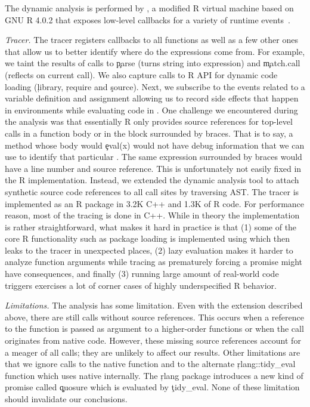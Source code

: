 \documentclass[screen,acmsmall]{acmart}
\newcommand{\mypara}[1]{\medskip\noindent\emph{#1}\xspace}
\begin{document}
The dynamic analysis is performed by \rdyntrace, a modified R virtual machine
based on GNU R 4.0.2 that exposes low-level callbacks for a variety of runtime
events~\cite{oopsla19b}.

\mypara{Tracer.} The tracer registers callbacks to all \eval functions as well
as a few other ones that allow us to better identify where do the expressions
come from. For example, we taint the results of calls to \c{parse} (turns
string into expression) and \c{match.call} (reflects on current call). We also
capture calls to R API for dynamic code loading (\eg\xspace \c{library},
\c{require} and \c{source}). Next, we subscribe to the events related to a
variable definition and assignment allowing us to record side effects that
happen in environments while evaluating code in \eval. One challenge we
encountered during the analysis was that essentially R only provides source
references for top-level calls in a function body or in the block surrounded
by braces. That is to say, a method whose body would \c{eval(x)} would not have
debug information that we can use to identify that particular \eval. The same
expression surrounded by braces would have a line number and source reference.
This is unfortunately not easily fixed in the R implementation. Instead, we
extended the dynamic analysis tool to attach synthetic source code references
to all \eval call sites by traversing AST.  The tracer is implemented as an R
package in 3.2K C++ and 1.3K of R code. For performance reason, most of the
tracing is done in C++. While in theory the implementation is rather
straightforward, what makes it hard in practice is that (1) some of the core R
functionality such as package loading is implemented using \eval which then
leaks to the tracer in unexpected places, (2) lazy evaluation makes it harder
to analyze function arguments while tracing as prematurely forcing a promise
might have consequences, and finally (3) running large amount of real-world
code triggers exercises a lot of corner cases of highly underspecified R
behavior.

\mypara{Limitations.} The analysis has some limitation. Even with the extension
described above, there are still \PkgUndefinedRnd \eval calls without source
references. This occurs when a reference to the \eval function is passed as
argument to a higher-order functions or when the \eval call originates from
native code. However, these missing source references account for a meager
\PkgUndefinedRatio of all calls; they are unlikely to affect our results. Other
limitations are that we ignore calls to the native \eval function and to the
alternate \c{rlang::tidy\_eval} function which uses native \eval internally.
The \c{rlang} package introduces a new kind of promise called \c{quosure} which
is evaluated by \c{tidy\_eval}. None of these limitation should invalidate our
conclusions.
\end{document}
